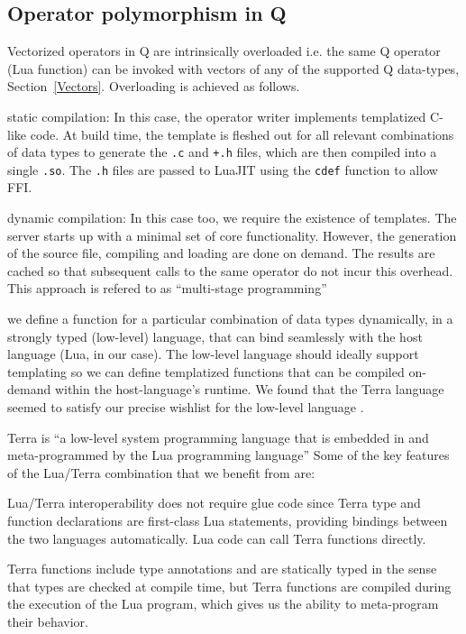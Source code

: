 \subsection{Operator polymorphism in Q}
\label{polymorphism}

Vectorized operators in Q are intrinsically overloaded i.e. the same Q operator
(Lua function) can be invoked with vectors of any of the supported Q data-types,
Section~\ref{Vectors}.
Overloading is achieved as follows.
\be
\item static compilation: In this case, the operator writer implements
  templatized C-like code. At build time, the template is fleshed out for all
  relevant combinations of data types to generate the {\tt .c} and {\tt +.h}
  files, which are then compiled into a single {\tt .so}. The {\tt .h} files
  are passed to LuaJIT using the {\tt cdef} function to allow FFI.
\item dynamic compilation: 
  In this case too, we require the existence of templates. 
  The server starts up with a minimal set of core functionality. 
  However, the generation of the source file, compiling and loading
  are done on demand. The results are cached
  so that subsequent calls to the same operator do not incur this overhead.
  This approach is refered to as  ``multi-stage programming''
\item we define a function for a particular combination of data types
  dynamically, in a strongly typed (low-level) language, that can bind seamlessly
  with the host language (Lua, in our case). The low-level language should ideally support templating so we can define templatized functions that can be compiled on-demand within the host-language's runtime.
  We found that the Terra language seemed to satisfy our precise wishlist for
  the low-level language \cite{devito2015}.

Terra is ``a low-level system programming language that is embedded in and
meta-programmed by the Lua programming language'' 
Some of the key features of the Lua/Terra combination that we benefit 
from are:
\be
\item Lua/Terra interoperability does not require glue code since Terra type and function declarations are first-class Lua statements, providing bindings between the two languages automatically. Lua code can call Terra functions directly.

\item Terra functions include type annotations and are statically typed in the sense that types are checked at compile time, but Terra functions are compiled during the execution of the Lua program, which gives us the ability to meta-program their behavior.

